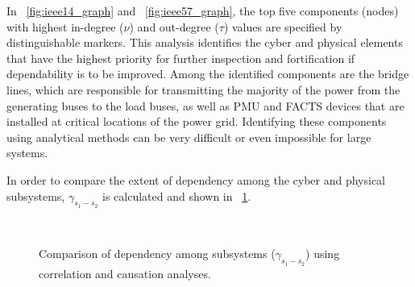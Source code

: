 \documentclass[12pt]{elsarticle}
\begin{document}
In \figurename~\ref{fig:ieee14_graph} and \figurename~\ref{fig:ieee57_graph}, the top five components (nodes) with highest in-degree ($\nu$) and out-degree ($\tau$) values are specified by distinguishable markers. This analysis identifies the cyber and physical elements that have the highest priority for further inspection and fortification if dependability is to be improved. Among the identified components are the bridge lines, which are responsible for transmitting the majority of the power from the generating buses to the load buses, as well as PMU and FACTS devices that are installed at critical locations of the power grid. Identifying these components using analytical methods can be very difficult or even impossible for large systems.


In order to compare the extent of dependency among the cyber and physical subsystems, $\gamma_{s_1-s_2}$ is calculated and shown in \figurename~\ref{fig:gamma}.

\begin{figure}
\centering
{}
~
\caption{Comparison of dependency among subsystems ($\gamma_{s_1-s_2}$) using correlation and causation analyses.}
\label{fig:gamma}
\end{figure}
\end{document}

